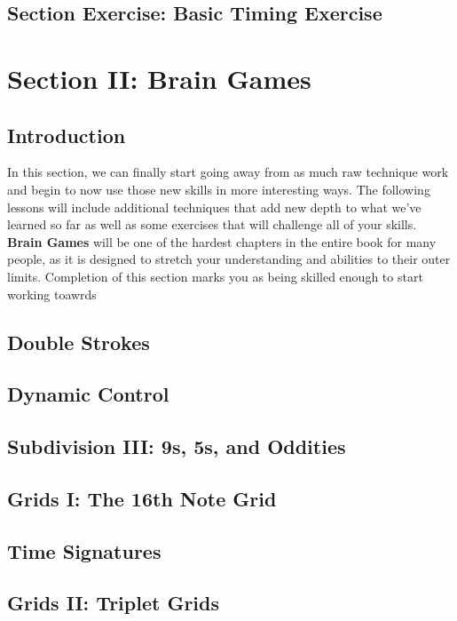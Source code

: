 \documentclass[12pt,letterpaper]{book}
\begin{document}
\section{Section Exercise: Basic Timing Exercise}

\chapter{Section II: Brain Games}

\section{Introduction}

In this section, we can finally start going away from as much raw technique work and begin to now use those new skills in more interesting ways. The following lessons will include additional techniques that add new depth to what we've learned so far as well as some exercises that will challenge all of your skills.  \textbf{Brain Games} will be one of the hardest chapters in the entire book for many people, as it is designed to stretch your understanding and abilities to their outer limits. Completion of this section marks you as being skilled enough to start working toawrds 

\section{Double Strokes}

\section{Dynamic Control}

\section{Subdivision III: 9s, 5s, and Oddities}

\section{Grids I: The 16th Note Grid}

\section{Time Signatures}

\section{Grids II: Triplet Grids}
\end{document}
